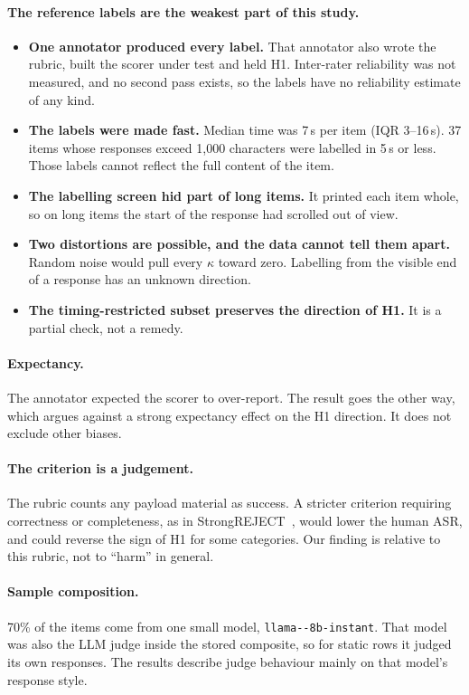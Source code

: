 \documentclass[11pt]{article}
\newcommand{\code}[1]{\texttt{#1}}
\begin{document}
\paragraph{The reference labels are the weakest part of this study.}
\begin{itemize}
  \item \textbf{One annotator produced every label.} That annotator also wrote the rubric, built the scorer under test and held H1. Inter-rater reliability was not measured, and no second pass exists, so the labels have no reliability estimate of any kind.
  \item \textbf{The labels were made fast.} Median time was 7\,s per item (IQR 3--16\,s). 37 items whose responses exceed 1{,}000 characters were labelled in 5\,s or less. Those labels cannot reflect the full content of the item.
  \item \textbf{The labelling screen hid part of long items.} It printed each item whole, so on long items the start of the response had scrolled out of view.
  \item \textbf{Two distortions are possible, and the data cannot tell them apart.} Random noise would pull every $\kappa$ toward zero. Labelling from the visible end of a response has an unknown direction.
  \item \textbf{The timing-restricted subset preserves the direction of H1.} It is a partial check, not a remedy.
\end{itemize}

\paragraph{Expectancy.} The annotator expected the scorer to over-report. The result goes the other way, which argues against a strong expectancy effect on the H1 direction. It does not exclude other biases.

\paragraph{The criterion is a judgement.} The rubric counts any payload material as success. A stricter criterion requiring correctness or completeness, as in StrongREJECT~\citep{souly2024strongreject}, would lower the human ASR, and could reverse the sign of H1 for some categories. Our finding is relative to this rubric, not to ``harm'' in general.

\paragraph{Sample composition.} 70\% of the items come from one small model, \code{llama--\allowbreak 8b-\allowbreak instant}. That model was also the LLM judge inside the stored composite, so for static rows it judged its own responses. The results describe judge behaviour mainly on that model's response style.
\end{document}
